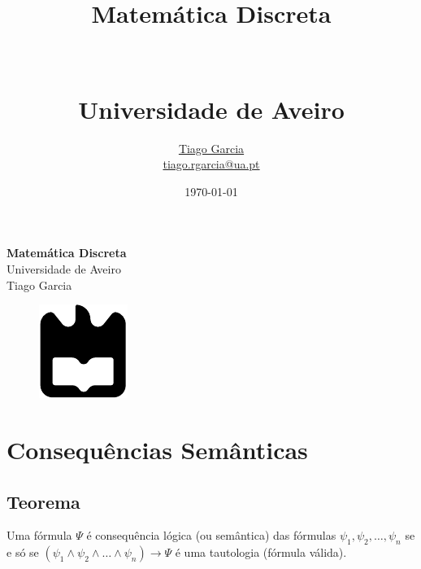 \documentclass[11pt]{report}
\begin{document}
\def\titulo{Matemática Discreta}
\def\autores{Tiago Garcia}
\def\autorescontactos{tiago.rgarcia@ua.pt}
\def\empresa{Universidade de Aveiro}
\def\logotipo{ua.pdf}

%
\def\tema{Lógica de 1ª Ordem}
%

\begin{titlepage}
\begin{center}
\vspace*{50mm}
{\Huge\textbf{\titulo}}\\
\vspace{10mm}
{\Large \empresa}\\
\vspace{10mm}
{\LARGE \autores}\\
\vspace{30mm}
\begin{figure}[h]
    \center
    \includegraphics{ua}\label{fig:ua-title}
\end{figure}
\vspace{30mm}
\end{center}
\end{titlepage}
\title{
{\LARGE\textbf{\titulo} }\\\\
{\Large \aula\\ \empresa}
}
\author{
    \href{https://github.com/TiagoRG}{\autores} \\
    \href{mailto:tiago.rgarcia@ua.pt}{\autorescontactos}
}
\date{\today}
\maketitle
{}
\clearpage


    \chapter*{Consequências Semânticas}
    \section*{Teorema}
    Uma fórmula $\Psi$ é consequência lógica (ou semântica) das fórmulas $\psi_1, \psi_2, \ldots, \psi_n$ se e só se $(\psi_1 \wedge \psi_2 \wedge \ldots \wedge \psi_n) \rightarrow \Psi$ é uma tautologia (fórmula válida).
\end{document}
